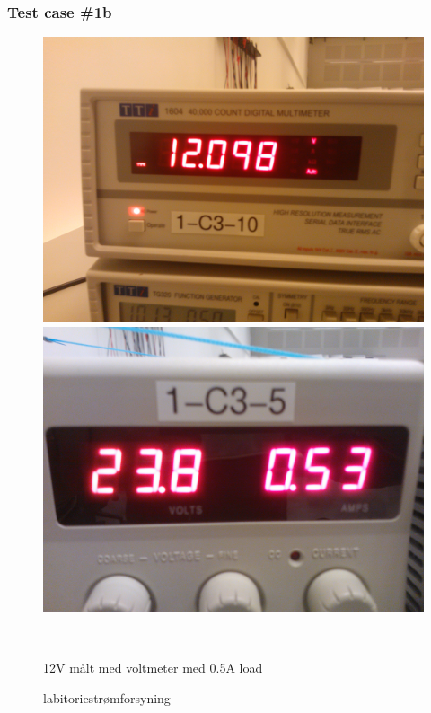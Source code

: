 \subsubsection{Test case \#1b}
\begin{figure}[htbp] \centering
\begin{minipage}[c]{0.48\textwidth} \centering
\includegraphics[width=1.00\textwidth]{billeder/12V_05A_meter.jpg} 
\end{minipage} \hfill
\begin{minipage}[c]{0.48\textwidth} \centering
\includegraphics[width=1.00\textwidth]{billeder/12V_05A_power.jpg} 
\end{minipage} \\ 
\begin{minipage}[b]{0.48\textwidth}
\caption{12V målt med voltmeter med 0.5A load} 
\label{fig:udgang_12V_05A}
\end{minipage} \hfill
\begin{minipage}[b]{0.48\textwidth}
\caption{labitoriestrømforsyning} 
\label{fig:forsyning_12V_05A}
\end{minipage}
\end{figure}
